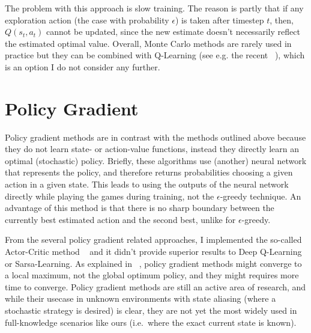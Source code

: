 The problem with this approach is slow training. The reason is partly that if any exploration action (the case with probability $\epsilon$) is taken after timestep $t$, then, $Q(s_t,a_t)$ cannot be updated, since the new estimate doesn't necessarily reflect the estimated optimal value. Overall, Monte Carlo methods are rarely used in practice but they can be combined with Q-Learning (see e.g. the recent ~\cite{wang2018montecarloqlearning}), which is an option I do not consider any further.

\section{Policy Gradient}

Policy gradient methods are in contrast with the methods outlined above because they do not learn state- or action-value functions, instead they directly learn an optimal (stochastic) policy. Briefly, these algorithms use (another) neural network that represents the policy, and therefore returns probabilities choosing a given action in a given state. This leads to using the outputs of the neural network directly while playing the games during training, not the $\epsilon$-greedy technique. An advantage of this method is that there is no sharp boundary between the currently best estimated action and the second best, unlike for $\epsilon$-greedy. 



From the several policy gradient related approaches, I implemented the so-called Actor-Critic method ~\cite{grondman2012actorcritic} and it didn't provide superior results to Deep Q-Learning or Sarsa-Learning. As explained in ~\cite{bhandari2019policygradientconvergence}, policy gradient methods might converge to a local maximum, not the global optimum policy, and they might requires more time to converge. Policy gradient methods are still an active area of research, and while their usecase in unknown environments with state aliasing (where a stochastic strategy is desired) is clear, they are not yet the most widely used in full-knowledge scenarios like ours (i.e.\ where the exact current state is known).
